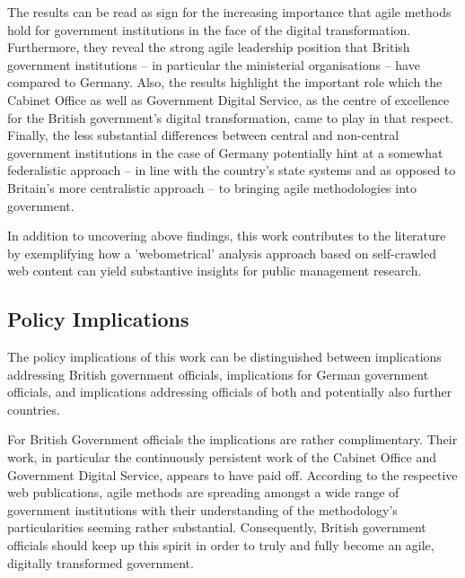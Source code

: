 \endgroup
\vspace{-0.1cm}


The results can be read as sign for the increasing importance that agile methods hold for government institutions in the face of the digital transformation. Furthermore, they reveal the strong agile leadership position that British government institutions – in particular the ministerial organisations – have compared to Germany. Also, the results highlight the important role which the Cabinet Office as well as Government Digital Service, as the centre of excellence for the British government's digital transformation, came to play in that respect. Finally, the less substantial differences between central and non-central government institutions in the case of Germany potentially hint at a somewhat federalistic approach – in line with the country's state systems \parencite{Elazar1997} and as opposed to Britain's more centralistic approach – to bringing agile methodologies into government. 

In addition to uncovering above findings, this work contributes to the literature by exemplifying how a 'webometrical' analysis approach \parencite{Thelwall2009} based on self-crawled web content can yield substantive insights for public management research. 

\subsection{Policy Implications}
The policy implications of this work can be distinguished between implications addressing British government officials, implications for German government officials, and implications addressing officials of both and potentially also further countries.

For British Government officials the implications are rather complimentary. Their work, in particular the continuously persistent work of the Cabinet Office and Government Digital Service, appears to have paid off. According to the respective web publications, agile methods are spreading amongst a wide range of government institutions with their understanding of the methodology's particularities seeming rather substantial. Consequently, British government officials should keep up this spirit in order to truly and fully become an agile, digitally transformed government.


